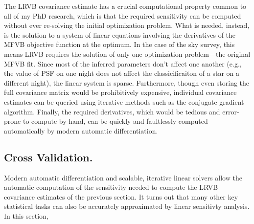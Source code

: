 The LRVB covariance estimate has a crucial computational property common to all
of my PhD research, which is that the required sensitivity can be computed
without ever re-solving the initial optimization problem.  What is needed,
instead, is the solution to a system of linear equations involving the
derivatives of the MFVB objective function at the optimum.  In the case of the
sky survey, this means LRVB requires the solution of only one optimization
problem---the original MFVB fit.  Since most of the inferred parameters don't
affect one another (e.g., the value of PSF on one night does not affect the
classicificaiton of a star on a different night), the linear system is sparse.
Furthermore, though even storing the full covariance matrix would be
prohibitively expensive, individual covariance estimates can be queried using
iterative methods such as the conjugate gradient algorithm.  Finally, the
required derivatives, which would be tedious and error-prone to compute by hand,
can be quickly and faultlessly computed automatically by modern automatic
differentiation.

\subsection*{Cross Validation.}

Modern automatic differentiation and scalable, iterative linear solvers
allow the automatic computation of the sensitivity needed to compute the LRVB
covariance estimates of the previous section.  It turns out that many other
key statistical tasks can also be accurately approximated by linear sensitivty
analysis.  In this section,







